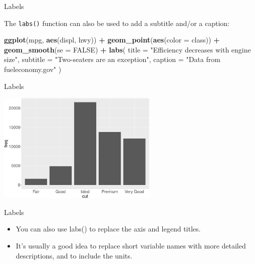 \documentclass[ignorenonframetext,]{beamer}
\newenvironment{Shaded}{\begin{snugshade}}{\end{snugshade}}
\newcommand{\DataTypeTok}[1]{\textcolor[rgb]{0.13,0.29,0.53}{#1}}
\newcommand{\KeywordTok}[1]{\textcolor[rgb]{0.13,0.29,0.53}{\textbf{#1}}}
\newcommand{\NormalTok}[1]{#1}
\newcommand{\OperatorTok}[1]{\textcolor[rgb]{0.81,0.36,0.00}{\textbf{#1}}}
\newcommand{\OtherTok}[1]{\textcolor[rgb]{0.56,0.35,0.01}{#1}}
\newcommand{\StringTok}[1]{\textcolor[rgb]{0.31,0.60,0.02}{#1}}
\begin{document}
\begin{frame}[fragile]{Labels}
\protect\hypertarget{labels-2}{}

The \texttt{labs()} function can also be used to add a subtitle and/or a
caption:

\begin{Shaded}
\begin{Highlighting}[]
\KeywordTok{ggplot}\NormalTok{(mpg, }\KeywordTok{aes}\NormalTok{(displ, hwy)) }\OperatorTok{+}
\StringTok{  }\KeywordTok{geom_point}\NormalTok{(}\KeywordTok{aes}\NormalTok{(}\DataTypeTok{color =}\NormalTok{ class)) }\OperatorTok{+}
\StringTok{  }\KeywordTok{geom_smooth}\NormalTok{(}\DataTypeTok{se =} \OtherTok{FALSE}\NormalTok{) }\OperatorTok{+}
\StringTok{  }\KeywordTok{labs}\NormalTok{(}
    \DataTypeTok{title =} \StringTok{"Efficiency decreases with engine size"}\NormalTok{,}
    \DataTypeTok{subtitle =} \StringTok{"Two-seaters are an exception"}\NormalTok{,}
    \DataTypeTok{caption =} \StringTok{"Data from fueleconomy.gov"}
\NormalTok{  )}
\end{Highlighting}
\end{Shaded}

\end{frame}

\begin{frame}{Labels}
\protect\hypertarget{labels-3}{}

\begin{center}\includegraphics[height=200px]{data-visualization_files/figure-beamer/unnamed-chunk-115-1} \end{center}

\end{frame}

\begin{frame}{Labels}
\protect\hypertarget{labels-4}{}

\begin{itemize}
\item
  You can also use labs() to replace the axis and legend titles.
\item
  It's usually a good idea to replace short variable names with more
  detailed descriptions, and to include the units.
\end{itemize}

\end{frame}
\end{document}

